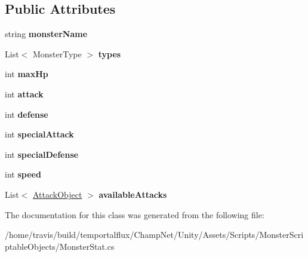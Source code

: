 \subsection*{Public Attributes}
\begin{DoxyCompactItemize}
\item 
\hypertarget{class_monster_stat_ae1f09abad9691a1b0df3b3a3575a64e3}{string {\bfseries monster\-Name}}\label{class_monster_stat_ae1f09abad9691a1b0df3b3a3575a64e3}

\item 
\hypertarget{class_monster_stat_a01771faf888660584ddf5e134d4da3fb}{List$<$ Monster\-Type $>$ {\bfseries types}}\label{class_monster_stat_a01771faf888660584ddf5e134d4da3fb}

\item 
\hypertarget{class_monster_stat_a3f84d73d947c10926862b904308f01ee}{int {\bfseries max\-Hp}}\label{class_monster_stat_a3f84d73d947c10926862b904308f01ee}

\item 
\hypertarget{class_monster_stat_aa712f00d29d985ecbf192710dd093e42}{int {\bfseries attack}}\label{class_monster_stat_aa712f00d29d985ecbf192710dd093e42}

\item 
\hypertarget{class_monster_stat_adcd2f958be981766592eefec3d7cd7da}{int {\bfseries defense}}\label{class_monster_stat_adcd2f958be981766592eefec3d7cd7da}

\item 
\hypertarget{class_monster_stat_ad1ef4ed9e67df473269df08ba716ce0e}{int {\bfseries special\-Attack}}\label{class_monster_stat_ad1ef4ed9e67df473269df08ba716ce0e}

\item 
\hypertarget{class_monster_stat_a38187f97efd1e52b77340058ecef8198}{int {\bfseries special\-Defense}}\label{class_monster_stat_a38187f97efd1e52b77340058ecef8198}

\item 
\hypertarget{class_monster_stat_a8e1945c1a296695622bada26319ff9e3}{int {\bfseries speed}}\label{class_monster_stat_a8e1945c1a296695622bada26319ff9e3}

\item 
\hypertarget{class_monster_stat_ae5ba7dc95fd5115dfed29cfeaafae51f}{List$<$ \hyperlink{class_attack_object}{Attack\-Object} $>$ {\bfseries available\-Attacks}}\label{class_monster_stat_ae5ba7dc95fd5115dfed29cfeaafae51f}

\end{DoxyCompactItemize}


The documentation for this class was generated from the following file\-:\begin{DoxyCompactItemize}
\item 
/home/travis/build/temportalflux/\-Champ\-Net/\-Unity/\-Assets/\-Scripts/\-Monster\-Scriptable\-Objects/Monster\-Stat.\-cs\end{DoxyCompactItemize}
